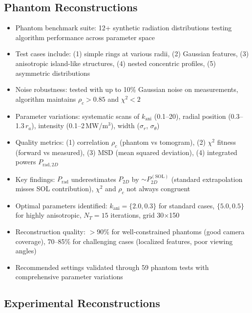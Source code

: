 \documentclass[11pt,a4paper]{article}
\begin{document}
\subsection{Phantom Reconstructions}

\begin{itemize}
\item Phantom benchmark suite: 12+ synthetic radiation distributions testing algorithm performance across parameter space
\item Test cases include: (1) simple rings at various radii, (2) Gaussian features, (3) anisotropic island-like structures, (4) nested concentric profiles, (5) asymmetric distributions
\item Noise robustness: tested with up to 10\% Gaussian noise on measurements, algorithm maintains $\rho_c>0.85$ and $\chi^2<2$
\item Parameter variations: systematic scans of $k_{\text{ani}}$ (0.1--20), radial position (0.3--1.3\,$r_a$), intensity (0.1--2\,MW/m$^3$), width ($\sigma_r$, $\sigma_\theta$)
\item Quality metrics: (1) correlation $\rho_c$ (phantom vs tomogram), (2) $\chi^2$ fitness (forward vs measured), (3) MSD (mean squared deviation), (4) integrated powers $P_{\text{rad},2D}$
\item Key findings: $P_{\text{rad}}$ underestimates $P_{2D}$ by $\sim P_{2D}^{(\text{SOL})}$ (standard extrapolation misses SOL contribution), $\chi^2$ and $\rho_c$ not always congruent
\item Optimal parameters identified: $k_{\text{ani}}=\{2.0, 0.3\}$ for standard cases, $\{5.0, 0.5\}$ for highly anisotropic, $N_T=15$ iterations, grid 30$\times$150
\item Reconstruction quality: $>90\%$ for well-constrained phantoms (good camera coverage), 70--85\% for challenging cases (localized features, poor viewing angles)
\item Recommended settings validated through 59 phantom tests with comprehensive parameter variations
\end{itemize}

\subsection{Experimental Reconstructions}
\end{document}
